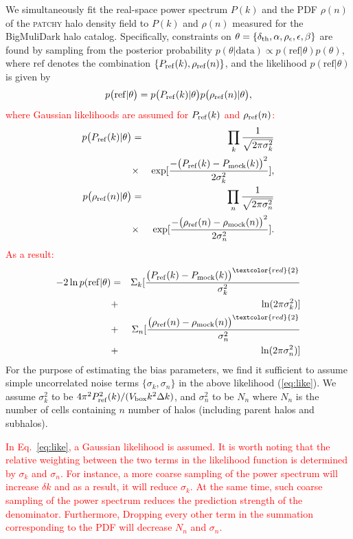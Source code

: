 \documentclass[english,usenatbib]{mn2e}
\newcommand{\tod}[1]{{\textcolor{red}{ #1}}}
\newcommand{\be}{\begin{equation}}
\newcommand{\ee}{\end{equation}}
\newcommand{\ba}{\begin{eqnarray}}
\newcommand{\ea}{\end{eqnarray}}
\begin{document}
We simultaneously fit the real-space power spectrum $P(k)$ and the PDF $\rho(n)$ of the \textsc{patchy} halo density field to $P(k)$ and $\rho(n)$ measured for the BigMuliDark halo catalog. Specifically, constraints on $\theta = \{\delta_{\rm th},\alpha, \rho_{\epsilon},\epsilon, \beta\}$ are found by sampling from the posterior probability $p(\theta|\mathrm{data}) \propto p(\mathrm{ref}|\theta)p(\theta)$, where $\mathrm{ref}$ denotes the combination $\{P_{\rm ref} (k), \rho_{\rm ref}(n)\}$, and the likelihood $p(\mathrm{ref}|\theta)$ is given by
\tod{
\be
p\big(\mathrm{ref}|\theta \big) = p\big(P_{\rm ref}(k)|\theta \big ) p\big(\rho_{\rm ref}(n)|\theta \big),
\label{eq:probs}
\ee
where Gaussian likelihoods are assumed for $P_{\rm ref}(k)$ and $\rho_{\rm ref}(n)$:
\ba
p\big(P_{\rm ref}(k)|\theta \big ) &=& \prod_{k} \frac{1}{\sqrt{2\pi\sigma_k^2}} \\ 
&\times& \exp[\frac{-\big(P_{\rm ref}(k)-P_{\rm mock}(k)\big)^2}{2\sigma_k^{2}}],\\
p\big(\rho_{\rm ref}(n)|\theta \big ) &=& \prod_{n} \frac{1}{\sqrt{2\pi\sigma_n^2}} \\ 
&\times& \exp[\frac{-\big(\rho_{\rm ref}(n)-\rho_{\rm mock}(n)\big)^2}{2\sigma_n^{2}}].
\ea
}
\tod{
As a result:
\ba
-2\ln p(\mathrm{ref}|\theta) &=& \Sigma_{k}[\frac{\big(P_{\rm ref}(k)-P_{\rm mock}(k)\big)^{\tod{2}}}{\sigma^{2}_{k}}  \nonumber \\
&+& \ln(2\pi\sigma_k^2)] \nonumber \\
&+& \Sigma_{n}[\frac{\big(\rho_{\rm ref}(n)-\rho_{\rm mock}(n)\big)^{\tod{2}}}{\sigma^{2}_{n}} \\
&+& \ln(2\pi\sigma_n^2)] \nonumber \\
\label{eq:like}
\ea
}
For the purpose of estimating the bias parameters, we find it sufficient to assume simple uncorrelated noise terms $\{\sigma_{k},\sigma_{n}\}$ in the above likelihood (\ref{eq:like}). We assume $\sigma_{k}^{2}$ to be $4\pi^{2} P_{\rm ref}^{2}(k)/(V_{\rm box}k^{2}\Delta k)$, and $\sigma_n^{2}$ to be $N_n$ where $N_n$ is the number of cells containing $n$ number of halos (including parent halos and subhalos).

\tod{In Eq.~\ref{eq:like}, a Gaussian likelihood is assumed. It is worth noting that the relative weighting between the two terms in the likelihood function is determined by $\sigma_k$ and $\sigma_n$. For instance, a more coarse sampling of the power spectrum will increase $\delta k$ and as a result, it will reduce $\sigma_k$. At the same time, such coarse sampling of the power spectrum reduces the prediction strength of the denominator. Furthermore, Dropping every other term in the summation corresponding to the PDF will decrease $N_n$ and $\sigma_n.$} 
\end{document}
